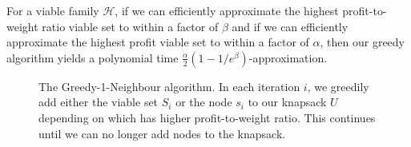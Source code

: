 \documentclass[12pt]{article}
\begin{document}
For a viable family $\mathcal{H}$, if we can efficiently approximate the highest profit-to-weight ratio viable set to within a factor of $\beta$ and if we can efficiently approximate the highest profit viable set to within a factor of $\alpha$, then our greedy algorithm yields a polynomial time $\frac{\alpha}{2}(1-1/e^\beta)$-approximation.













\begin{figure}[tb]
\begin{center}
\end{center}
\caption{\label{alg:greedy-1-neighbour} The {\sc Greedy-1-Neighbour} algorithm.  In each iteration $i$, we greedily add either the viable set $S_{i}$ or the node $s_{i}$ to our knapsack $U$ depending on which has higher profit-to-weight ratio.  This continues until we can no longer add nodes to the knapsack.}
\vspace{-4mm}
\end{figure}
\end{document}
